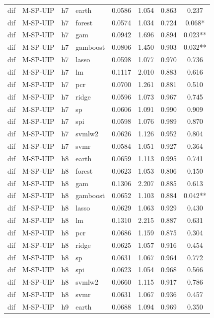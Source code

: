 \begin{ThreePartTable}
\begin{longtable}[t]{llclcccc}
\addlinespace
dif & M-SP-UIP & h7 & earth & 0.0586 & 1.054 & 0.863 & 0.237\\
dif & M-SP-UIP & h7 & forest & 0.0574 & 1.034 & 0.724 & 0.068*\\
dif & M-SP-UIP & h7 & gam & 0.0942 & 1.696 & 0.894 & 0.023**\\
dif & M-SP-UIP & h7 & gamboost & 0.0806 & 1.450 & 0.903 & 0.032**\\
dif & M-SP-UIP & h7 & lasso & 0.0598 & 1.077 & 0.970 & 0.736\\
dif & M-SP-UIP & h7 & lm & 0.1117 & 2.010 & 0.883 & 0.616\\
dif & M-SP-UIP & h7 & pcr & 0.0700 & 1.261 & 0.881 & 0.510\\
dif & M-SP-UIP & h7 & ridge & 0.0596 & 1.073 & 0.967 & 0.745\\
dif & M-SP-UIP & h7 & sp & 0.0606 & 1.091 & 0.990 & 0.909\\
dif & M-SP-UIP & h7 & spi & 0.0598 & 1.076 & 0.989 & 0.870\\
dif & M-SP-UIP & h7 & svmlw2 & 0.0626 & 1.126 & 0.952 & 0.804\\
dif & M-SP-UIP & h7 & svmr & 0.0584 & 1.051 & 0.927 & 0.364\\
\addlinespace
dif & M-SP-UIP & h8 & earth & 0.0659 & 1.113 & 0.995 & 0.741\\
dif & M-SP-UIP & h8 & forest & 0.0623 & 1.053 & 0.806 & 0.150\\
dif & M-SP-UIP & h8 & gam & 0.1306 & 2.207 & 0.885 & 0.613\\
dif & M-SP-UIP & h8 & gamboost & 0.0652 & 1.103 & 0.884 & 0.042**\\
dif & M-SP-UIP & h8 & lasso & 0.0629 & 1.063 & 0.929 & 0.430\\
dif & M-SP-UIP & h8 & lm & 0.1310 & 2.215 & 0.887 & 0.631\\
dif & M-SP-UIP & h8 & pcr & 0.0686 & 1.159 & 0.875 & 0.304\\
dif & M-SP-UIP & h8 & ridge & 0.0625 & 1.057 & 0.916 & 0.454\\
dif & M-SP-UIP & h8 & sp & 0.0631 & 1.067 & 0.964 & 0.772\\
dif & M-SP-UIP & h8 & spi & 0.0623 & 1.054 & 0.968 & 0.566\\
dif & M-SP-UIP & h8 & svmlw2 & 0.0660 & 1.115 & 0.917 & 0.786\\
dif & M-SP-UIP & h8 & svmr & 0.0631 & 1.067 & 0.936 & 0.457\\
\addlinespace
dif & M-SP-UIP & h9 & earth & 0.0688 & 1.094 & 0.969 & 0.350\\

\end{longtable}
\end{ThreePartTable}
